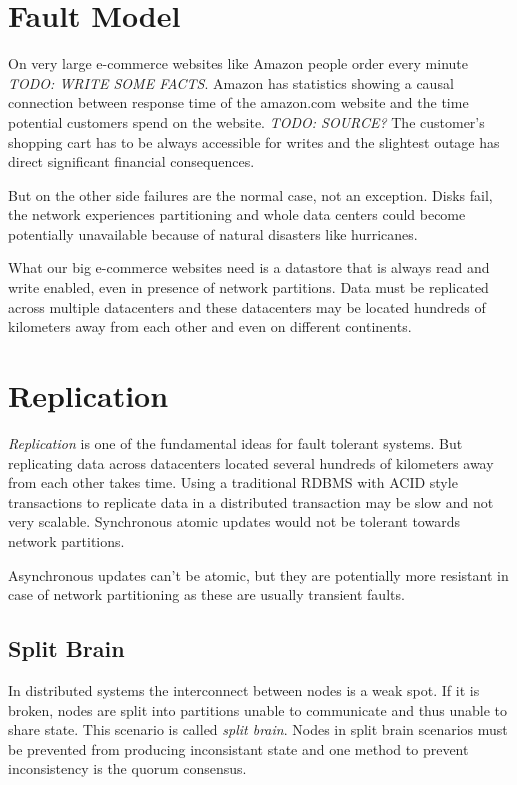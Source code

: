 \section{Fault Model}

On very large e-commerce websites like Amazon people order every
minute \emph{TODO: WRITE SOME FACTS}. Amazon has statistics showing
a causal connection between response time of the amazon.com website
and the time potential customers spend on the website.
\emph{TODO: SOURCE?} The customer's shopping cart has to be always
accessible for writes and the slightest outage has direct
significant financial consequences.

But on the other side failures are the normal case, not an
exception. Disks fail, the network experiences partitioning and
whole data centers could become potentially unavailable because of
natural disasters like hurricanes.

What our big e-commerce websites need is a datastore that is always
read and write enabled, even in presence of network partitions.
Data must be replicated across multiple datacenters and these
datacenters may be located hundreds of kilometers away from each
other and even on different continents.

\section{Replication}

\emph{Replication} is one of the fundamental ideas for fault
tolerant systems. But replicating data across datacenters located
several hundreds of kilometers away from each other takes time.
Using a traditional RDBMS with ACID style transactions to replicate
data in a distributed transaction may be slow and not very
scalable. Synchronous atomic updates would not be tolerant towards
network partitions.

Asynchronous updates can't be atomic, but they are potentially more
resistant in case of network partitioning as these are usually
transient faults.

\subsection{Split Brain}

In distributed systems the interconnect between nodes is a weak
spot. If it is broken, nodes are split into partitions unable to
communicate and thus unable to share state. This scenario is called
\emph{split brain}. Nodes in split brain scenarios must be
prevented from producing inconsistant state and one method to
prevent inconsistency is the quorum consensus.

